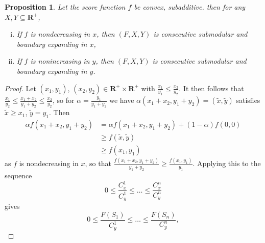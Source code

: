 \documentclass{article}
\newtheorem{prop}{Proposition}
\theoremstyle{case}
\begin{document}
\begin{prop}
Let the score function $f$ be convex, subadditive. then for any $X, Y \subseteq \mathbf{R}^+$,
\begin{enumerate}[(i)]
	\item If $f$ is nondecreasing in $x$, then $(F,X,Y)$ is consecutive submodular and boundary expanding in $x$,
	\item If $f$ is nonincreasing in $y$, then $(F,X,Y)$ is consecutive submodular and boundary expanding in $y$.
\end{enumerate}
\end{prop}
\begin{proof}
Let $(x_1,y_1)$, $(x_2,y_2) \in \mathbf{R}^+ \times \mathbf{R}^+$ with $\frac{x_1}{y_1} \leq \frac{x_2}{y_2}$. It then follows that $\frac{x_1}{y_2} \leq \frac{x_1 + x_2}{y_1 + y_2} \leq \frac{x_2}{y_2}$, so for $\alpha = \frac{y_1}{y_1 + y_2}$ we have $\alpha(x_1 + x_2, y_1 + y_2) = (\tilde{x}, \tilde{y})$ satisfies $\tilde{x} \geq x_1$, $\tilde{y} = y_1$. Then
\begin{align*}
\alpha f(x_1 + x_2, y_1 + y_2) &= \alpha f(x_1 + x_2, y_1 + y_2) + (1-\alpha)f(0, 0) \\
&\geq f(\tilde{x}, \tilde{y}) \\
&\geq f(x_1,y_1)
\end{align*}
as $f$ is nondecreasing in $x$, so that $\frac{f(x_1 + x_2,y_1 + y_2)}{y_1 + y_2} \geq \frac{f(x_1, y_1)}{y_1}$. Applying this to the sequence
\[
0 \leq \frac{C_x^1}{C_y^1} \leq \dots \leq \frac{C_x^n}{C_y^n}
\]
gives
\begin{equation}\label{eqn10}
0 \leq \frac{F(S_1)}{C_y^1} \leq \dots \leq \frac{F(S_n)}{C_y^n},
\end{equation}


\end{proof}
\end{document}
